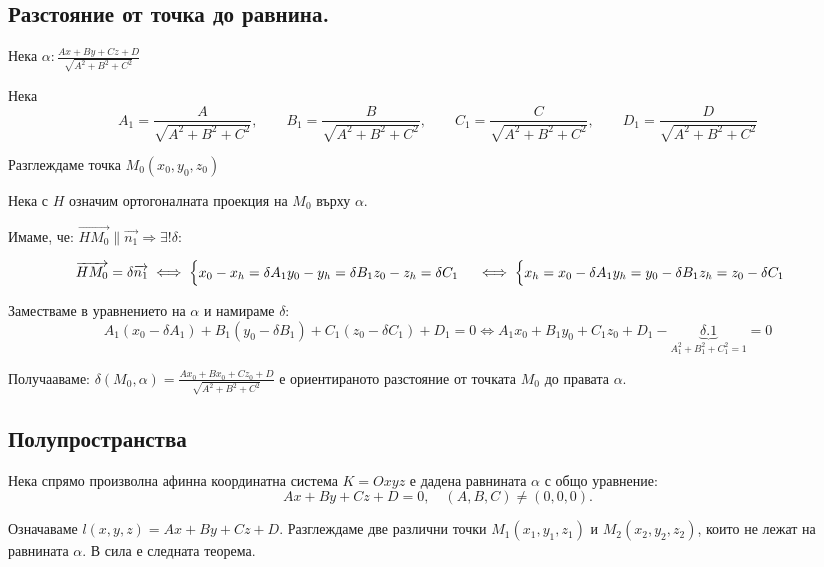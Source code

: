 \documentclass{article}
\renewcommand{\\}{\newline}
\begin{document}
\subsection{Разстояние от точка до равнина.}

Нека \(\alpha: \frac{Ax + By + Cz + D}{\sqrt{A^{2} + B^{2} + C^{2}}} \)  

Нека \[
  A_{1} = \frac{A}{\sqrt{A^{2}+B^{2}+C^{2}}},\qquad B_{1} = \frac{B}{\sqrt{A^{2}+B^{2}+C^{2}}}, \qquad C_{1} = \frac{C}{\sqrt{A^{2}+B^{2}+C^{2}}}, \qquad D_{1} = \frac{D}{\sqrt{A^{2}+B^{2}+C^{2}}}
\] 

Разглеждаме точка \(M_0(x_0, y_0, z_0)\) 

Нека с \(H\) означим ортогоналната проекция на \(M_0\) върху \(\alpha\).

Имаме, че: \(\overrightarrow{HM_0} \parallel \overrightarrow{n_1} \Rightarrow \exists ! \delta:\) 

\[
  \overrightarrow{HM_0} = \delta \overrightarrow{n_1} \iff \begin{cases}
    x_0 - x_h = \delta A_1\\
    y_0 - y_h = \delta B_1\\
    z_0 - z_h = \delta C_1
  \end{cases} \iff \begin{cases}
     x_h = x_0 -\delta A_1\\
     y_h = y_0 -\delta B_1\\
     z_h = z_0 -\delta C_1
  \end{cases} 
\] 

Заместваме в уравнението на \(\alpha\) и намираме \(\delta\): 
\[
  A_1(x_0 -\delta A_1) + B_1(y_0 -\delta B_1) + C_1(z_0 -\delta C_1) + D_1 = 0 \iff A_1x_0 + B_1y_0 + C_1z_0 + D_1 - \underbrace{\delta.1}_{A_1^{2} + B_1^{2} + C_1^{2} = 1} = 0
\]    

Получааваме: \(\delta(M_0, \alpha) = \frac{Ax_0 + Bx_0 + Cz_0 + D}{\sqrt{A^{2} + B^{2} + C^{2}}}\) е ориентираното разстояние от точката \(M_0\)  до правата \(\alpha\).  

\subsection{Полупространства}

Нека спрямо произволна афинна координатна система $K = Oxyz$ е дадена равнината $\alpha$ с общо уравнение:
\[Ax + By + Cz + D = 0, \quad (A, B, C) \neq (0, 0, 0).\]

Означаваме $l(x, y, z) = Ax + By + Cz + D$. Разглеждаме две различни точки $M_1(x_1, y_1, z_1)$ и $M_2(x_2, y_2, z_2)$, които не лежат на равнината $\alpha$. В сила е следната теорема.
\end{document}

